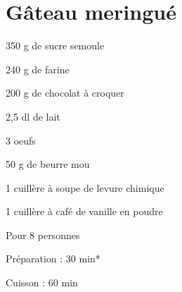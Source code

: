 \section{Gâteau meringué}

\begin{ingredients}
\item 350 g de sucre semoule
\item 240 g de farine
\item 200 g de chocolat à croquer
\item 2,5 dl de lait
\item 3 oeufs
\item 50 g de beurre mou
\item 1 cuillère à soupe de levure chimique
\item 1 cuillère à café de vanille en poudre
\end{ingredients}
\begin{infos}
\item Pour 8 personnes		%
\item Préparation : 30 min*		%
\item Cuisson : 60 min			%
\end{infos}

